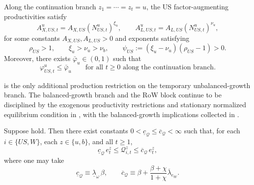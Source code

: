 \documentclass{article}
\begin{document}
\begin{ass}\label{ass_us_u_primitives}
Along the continuation branch $z_1=\cdots=z_t=u$, the US factor-augmenting productivities satisfy
\begin{equation}\label{US_u_productivity_primitives}
A_{X,US,t}^u=A_{X,US}(N_{US,t}^u)^{\xi_u},
\qquad
A_{L,US,t}^u=A_{L,US}(N_{US,t}^u)^{\nu_u},
\end{equation}
for some constants $A_{X,US},A_{L,US}>0$ and exponents satisfying
\begin{equation}\label{psi_US_def}
\rho_{US}>1,
\qquad
\xi_u>\nu_u>\nu_b,
\qquad
\psi_{US}:=(\xi_u-\nu_u)(\rho_{US}-1)>0.
\end{equation}
Moreover, there exists $\bar\varphi_u\in(0,1)$ such that
\begin{equation}\label{phi_u_upper_bound}
\varphi_{US,t}^u\le \bar\varphi_u
\qquad\text{for all }t\ge 0
\text{ along the continuation branch.}
\end{equation}
\end{ass}

 is the only additional production restriction on the temporary unbalanced-growth branch. The balanced-growth branch and the RoW block continue to be disciplined by the exogenous productivity restrictions and stationary normalized equilibrium condition in , with the balanced-growth implications collected in .

\begin{lem}\label{lem_stock_value_bounds}
Suppose  hold. Then there exist constants $0<\underline c_{\mathcal Q}\le \overline c_{\mathcal Q}<\infty$ such that, for each $i\in\{US,W\}$, each $z\in\{u,b\}$, and all $t\ge 1$,
\[
\underline c_{\mathcal Q}\,e_t^z
\le
\mathcal Q_{i,t}^z
\le
\overline c_{\mathcal Q}\,e_t^z,
\]
where one may take
\[
\underline c_{\mathcal Q}\equiv \underline\lambda_\omega\,\beta,
\qquad
\overline c_{\mathcal Q}\equiv
\beta+\frac{\beta+\chi}{1+\chi}\overline\lambda_{e_W}.
\]
\end{lem}
\end{document}
